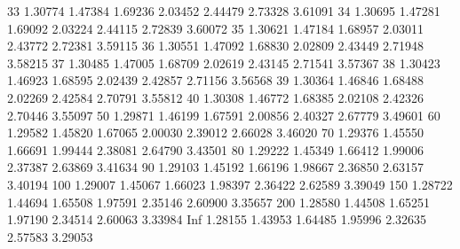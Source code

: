 \documentclass[onecolumn,11pt]{book}
\begin{document}
\begin{Schunk}
\begin{Soutput}
33  1.30774 1.47384 1.69236  2.03452  2.44479  2.73328   3.61091
34  1.30695 1.47281 1.69092  2.03224  2.44115  2.72839   3.60072
35  1.30621 1.47184 1.68957  2.03011  2.43772  2.72381   3.59115
36  1.30551 1.47092 1.68830  2.02809  2.43449  2.71948   3.58215
37  1.30485 1.47005 1.68709  2.02619  2.43145  2.71541   3.57367
38  1.30423 1.46923 1.68595  2.02439  2.42857  2.71156   3.56568
39  1.30364 1.46846 1.68488  2.02269  2.42584  2.70791   3.55812
40  1.30308 1.46772 1.68385  2.02108  2.42326  2.70446   3.55097
50  1.29871 1.46199 1.67591  2.00856  2.40327  2.67779   3.49601
60  1.29582 1.45820 1.67065  2.00030  2.39012  2.66028   3.46020
70  1.29376 1.45550 1.66691  1.99444  2.38081  2.64790   3.43501
80  1.29222 1.45349 1.66412  1.99006  2.37387  2.63869   3.41634
90  1.29103 1.45192 1.66196  1.98667  2.36850  2.63157   3.40194
100 1.29007 1.45067 1.66023  1.98397  2.36422  2.62589   3.39049
150 1.28722 1.44694 1.65508  1.97591  2.35146  2.60900   3.35657
200 1.28580 1.44508 1.65251  1.97190  2.34514  2.60063   3.33984
Inf 1.28155 1.43953 1.64485  1.95996  2.32635  2.57583   3.29053
\end{Soutput}
\end{Schunk}
  \normalsize
\end{document}
